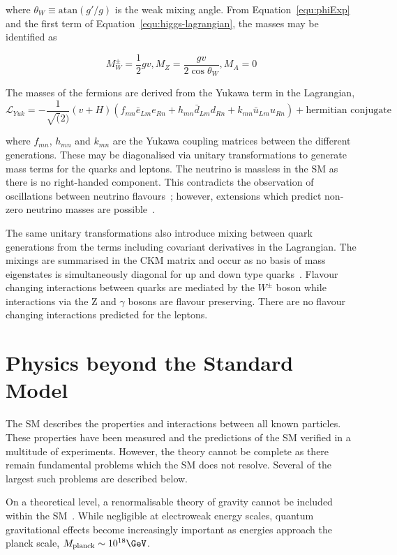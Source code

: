 \noindent where $\theta_W \equiv \text{atan}(g'/g)$ is the weak mixing angle. From Equation~\ref{equ:phiExp} and
the first term of Equation~\ref{equ:higgs-lagrangian}, the masses may be identified as

\begin{equation}
M_W^\pm = \frac{1}{2}gv, M_Z = \frac{gv}{2\cos\theta_W}, M_A = 0
\end{equation}

\noindent The masses of the fermions are derived from the Yukawa term in the Lagrangian, 
\begin{equation}
\mathcal{L}_{Yuk} = - \frac{1}{\sqrt(2)}(v + H)(f_{mn} \bar{e}_{Lm}e_{Rn} + h_{mn} \bar{d}_{Lm}d_{Rn} + k_{mn} \bar{u}_{Lm}u_{Rn}) + \text{hermitian conjugate}
\end{equation}

\noindent where $f_{mn}$, $h_{mn}$ and $k_{mn}$ are the Yukawa coupling matrices between the different generations. These may be diagonalised via unitary transformations
to generate mass terms for the quarks and leptons. The neutrino is massless in the SM as there is no right-handed component.
This contradicts the observation of oscillations between neutrino flavours~\cite{neutOsc};
however, extensions which predict non-zero neutrino masses are possible~\cite{neutM}. 

The same unitary transformations also introduce mixing between quark generations from the 
terms including covariant derivatives in the Lagrangian. The mixings are summarised in the 
CKM matrix and occur as no basis of mass eigenstates is simultaneously diagonal for 
up and down type quarks~\cite{CKM}. Flavour changing
interactions between quarks are mediated by the $W^{\pm}$ boson while interactions via 
the Z and $\gamma$ bosons are flavour preserving. There are no flavour changing interactions
predicted for the leptons.

\section{Physics beyond the Standard Model}

The SM describes the properties and interactions between all known particles. These properties 
have been measured and the predictions of the SM verified in a multitude
of experiments. However, the theory cannot be complete 
as there remain fundamental problems which the SM does not resolve.
Several of the largest such problems are described below.

On a theoretical level, a renormalisable theory of gravity cannot be included within 
the SM~\cite{gravRenorm}. While negligible at electroweak energy
scales, quantum gravitational effects become increasingly important as
energies approach the planck scale, $M_{\text{planck}} \sim 10^{18} \GeV$. 


